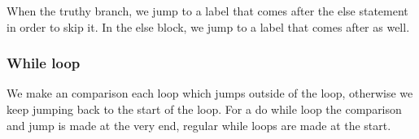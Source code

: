 When the truthy branch, we jump to a label that comes after the else statement in order to skip it.
In the else block, we jump to a label that comes after as well.

\subsubsection{While loop}\label{ssub:while_loop}

We make an comparison each loop which jumps outside of the loop, otherwise we keep jumping back to the start of the loop.
For a do while loop the comparison and jump is made at the very end, regular while loops are made at the start.


